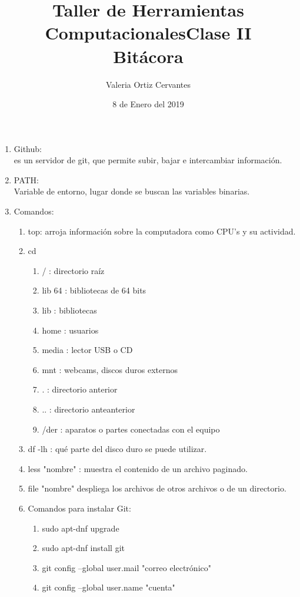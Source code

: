 \documentclass[letterpaper, 12pt, oneside]{article} %
\title{\Huge Taller de Herramientas Computacionales}
\author{Valeria Ortiz Cervantes}
\date{8 de Enero del 2019}
\begin{document}
	\maketitle
	\newpage
	\title{Clase II\\Bitácora\\}
	\begin{enumerate}
		\item Github:\\ es un servidor de git, que permite subir, bajar e intercambiar información.
		\item  PATH:\\ Variable de entorno, lugar donde se buscan las variables binarias.
		\item Comandos:
		\begin{enumerate}
			\item top: arroja información sobre la computadora como CPU's y su actividad.
			\item cd
			\begin{enumerate}
				\item  / : directorio raíz 
				\item lib 64 : bibliotecas de 64 bits
				\item lib : bibliotecas
				\item home : usuarios
				\item media : lector USB o CD
				\item mnt : webcams, discos duros externos
				\item . : directorio anterior
				\item .. : directorio anteanterior
				\item /der : aparatos o partes conectadas con el equipo 
			\end{enumerate}
			\item df -lh : qué parte del disco duro se puede utilizar. 
			\item less "nombre" : muestra el contenido de un archivo paginado. 
			\item file "nombre" despliega los archivos de otros archivos o de un directorio. 
			\item Comandos para instalar Git:
			\begin{enumerate}
				\item sudo apt-dnf upgrade
				\item sudo apt-dnf install git
				\item git config --global user.mail "correo electrónico"
				\item git config --global user.name "cuenta"

\end{enumerate}
\end{enumerate}
\end{enumerate}
\end{document}
